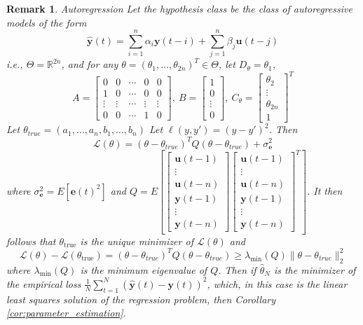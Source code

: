 \documentclass{ifacconf}
\def\rve{{\mathbf{e}}}
\def\rvu{{\mathbf{i}}}
\def\rvu{{\mathbf{u}}}
\def\rvy{{\mathbf{y}}}
\newtheorem{Remark}{Remark}[section]
\begin{document}
\begin{Remark}{Autoregression}
Let the hypothesis class be the class of autoregressive models of the form
 \[ 
      \hat{\rvy}(t)=\sum_{i=1}^{n} \alpha_i \rvy(t-i) + \sum_{j=1}^{n} \beta_j \rvu(t-j)
\]
i.e., $\Theta=\mathbb{R}^{2n}$, and 
    for any $\theta=(\theta_1,\ldots, \theta_{2n})^T \in \Theta$, let
    $D_{\theta}=\theta_1$,
    \[ 
    A=\begin{bmatrix} 0 & 0 & \cdots & 0 & 0 \\ 
        1 & 0 & \cdots & 0 &0 \\
        \vdots & \vdots & \cdots & \vdots & \vdots \\
        0 & 0 & \cdots & 1 & 0
    \end{bmatrix}, ~ 
    B=\begin{bmatrix} 1 \\ 0 \\ \vdots \\ 0 \end{bmatrix}, ~
    C_\theta=\begin{bmatrix} \theta_2 \\ \vdots \\ \theta_{2n} \\ 1 \end{bmatrix}^T
    \]
    Let $\theta_{true}=(a_1, \ldots, a_n, b_1, \ldots, b_n)$
    Let $\ell(y,y')=(y-y')^2$. Then 
    \[ \mathcal{L}(\theta)=(\theta-\theta_{true})^T Q (\theta-\theta_{true})
       + \sigma_{\rve}^2
    \]
    where  $\sigma_{\rve}^2=E[\rve(t)^2]$ and 
    $Q=E[\begin{bmatrix} \rvu(t-1) \\ \vdots \\ \rvu(t-n) \\ \rvy(t-1) \\ \vdots \\ \rvy(t-n) \end{bmatrix}
    \begin{bmatrix} \rvu(t-1) \\ \vdots \\ \rvu(t-n) \\ \rvy(t-1) \\ \vdots \\ \rvy(t-n) \end{bmatrix}^T]$.
    It then follows that 
    $\theta_{\text{true}}$ is the unique minimizer of $\mathcal{L}(\theta)$ and
    \[ \mathcal{L}(\theta)-\mathcal{L}(\theta_{\text{true}})=(\theta-\theta_{true})^T Q (\theta-\theta_{true}) \ge \lambda_{\min}(Q) \|\theta-\theta_{true}\|_2^2
    \]
    where $\lambda_{\min}(Q)$ is the minimum eigenvalue of $Q$.
    Then if $\hat{\theta}_N$ is the minimizer of the empirical loss
    \( \frac{1}{N} \sum_{t=1}^{N} (\hat{\rvy}(t)-\rvy(t))^2 \), which, in this 
    case is the linear least squares solution of the regression problem,
    then Corollary \ref{cor:parameter_estimation}. 
  \end{Remark}
  
\end{document}
